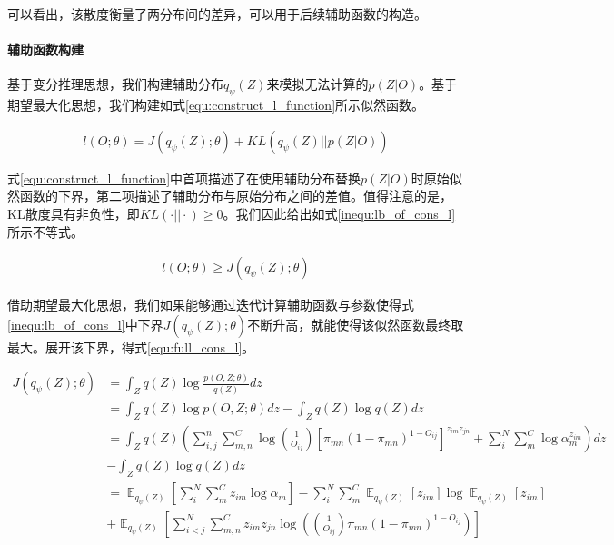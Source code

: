 可以看出，该散度衡量了两分布间的差异，可以用于后续辅助函数的构造。
\paragraph{辅助函数构建}

基于变分推理思想，我们构建辅助分布$q_\psi(Z)$来模拟无法计算的$p(Z|O)$。基于期望最大化思想，我们构建如式\ref{equ:construct_l_function}所示似然函数。

\begin{equation}\label{equ:construct_l_function}
  \begin{aligned}
l(O;\theta)=J(q_\psi(Z);\theta)+KL(q_\psi(Z)||p(Z|O))
\end{aligned}\end{equation}

式\ref{equ:construct_l_function}中首项描述了在使用辅助分布替换$p(Z|O)$时原始似然函数的下界，第二项描述了辅助分布与原始分布之间的差值。值得注意的是，KL散度具有非负性，即$KL(\cdot||\cdot)\geq 0$。我们因此给出如式\ref{inequ:lb_of_cons_l}所示不等式。

\begin{equation}\label{inequ:lb_of_cons_l}
  \begin{aligned}
l(O;\theta)\geq J(q_\psi(Z);\theta)
\end{aligned}\end{equation}

借助期望最大化思想，我们如果能够通过迭代计算辅助函数与参数使得式\ref{inequ:lb_of_cons_l}中下界$J(q_\psi(Z);\theta)$不断升高，就能使得该似然函数最终取最大。展开该下界，得式\ref{equ:full_cons_l}。

\begin{equation}\label{equ:full_cons_l}
  \begin{aligned}
J(q_\psi(Z);\theta)&={} \int_Z q(Z) \log \frac{p(O,Z;\theta)}{q(Z)}dz\\
&={} \int_Z q(Z) \log p(O,Z;\theta)dz-\int_Z q(Z) \log q(Z)dz\\
&={} \int_Z q(Z) ( \sum_{i,j}^{n}\sum_{m,n}^C\log \binom{1}{O_{ij}}[\pi_{mn}(1-\pi_{mn})^{1-O_{ij}}]^{ z_{im}z_{jn}}+
\sum_{i}^N\sum_m^C\log\alpha_m^{z_{im}})dz\\
&-\int_Z q(Z) \log q(Z)dz\\
&={}\mathop{\mathbb{E}}_{q_\psi(Z)}[\sum_i^N\sum_m^Cz_{im}\log \alpha_m]-\sum_i^N\sum_m^C \mathop{\mathbb{E}}_{q_\psi(Z)}[z_{im}]\log \mathop{\mathbb{E}}_{q_\psi(Z)}[z_{im}]\\
&+\mathop{\mathbb{E}}_{q_\psi(Z)}[\sum_{i<j}^N\sum_{m,n}^Cz_{im}z_{jn}\log ( \binom{1}{O_{ij}}
\pi_{mn}(1-\pi_{mn})^{1-O_{ij}})]
\end{aligned}\end{equation}

